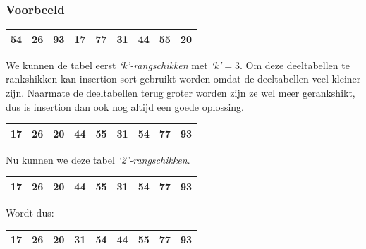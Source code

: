 \documentclass{article}
\begin{document}
\subsubsection{Voorbeeld} %
\label{sub:shell_sort_voorbeeld}
\begin{center}
\begin{tabular}{ |c|c|c|c|c|c|c|c|c| }
\hline
\cellcolor{gray!25}54 & \cellcolor{gray!50}26 & \cellcolor{gray!75}93 & \cellcolor{gray!25}17 & \cellcolor{gray!50}77 & \cellcolor{gray!75}31 & \cellcolor{gray!25}44 & \cellcolor{gray!50}55 & \cellcolor{gray!75}20 \\
\hline
\end{tabular}
\end{center}
We kunnen de tabel eerst \textit{`k'-rangschikken} met \textit{`k'}$ = 3$. Om deze deeltabellen te rankshikken kan insertion sort gebruikt worden omdat de deeltabellen veel kleiner zijn. Naarmate de deeltabellen terug groter worden zijn ze wel meer gerankshikt, dus is insertion dan ook nog altijd een goede oplossing.\newline
\begin{center}
\begin{tabular}{ |c|c|c|c|c|c|c|c|c| }
\hline
\cellcolor{gray!25}17 & \cellcolor{gray!50}26 & \cellcolor{gray!75}20 & \cellcolor{gray!25}44 & \cellcolor{gray!50}55 & \cellcolor{gray!75}31 & \cellcolor{gray!25}54 & \cellcolor{gray!50}77 & \cellcolor{gray!75}93 \\
\hline
\end{tabular}
\end{center}
Nu kunnen we deze tabel \textit{`2'-rangschikken}.
\begin{center}
\begin{tabular}{ |c|c|c|c|c|c|c|c|c| }
\hline
\cellcolor{gray!25}17 & \cellcolor{gray!50}26 & \cellcolor{gray!25}20 & \cellcolor{gray!50}44 & \cellcolor{gray!25}55 & \cellcolor{gray!50}31 & \cellcolor{gray!25}54 & \cellcolor{gray!50}77 & \cellcolor{gray!25}93 \\
\hline
\end{tabular}
\end{center}
Wordt dus:
\begin{center}
\begin{tabular}{ |c|c|c|c|c|c|c|c|c| }
\hline
\cellcolor{gray!25}17 & \cellcolor{gray!50}26 & \cellcolor{gray!25}20 & \cellcolor{gray!50}31 & \cellcolor{gray!25}54 & \cellcolor{gray!50}44 & \cellcolor{gray!25}55 & \cellcolor{gray!50}77 & \cellcolor{gray!25}93 \\
\hline
\end{tabular}
\end{center}
\end{document}
